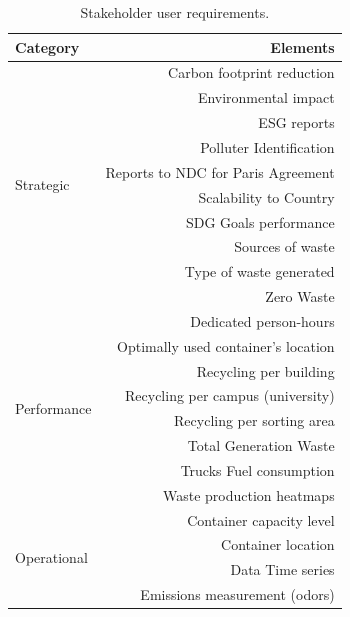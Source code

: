 \documentclass[authoryear,preprint,review,12pt]{elsarticle}
\begin{document}
    \begin{table}
        \centering
        \caption{Stakeholder user requirements.}
        \scriptsize
        \label{tab:initialReq}
        \begin{tabularx}{\columnwidth}{X r}
            \toprule
            Category&Elements\\
            \midrule
            \multirow{10}{*}{Strategic} &Carbon footprint reduction\\
                                    &Environmental impact\\
                                    &ESG reports\\
                                    &Polluter Identification\\
                                    &Reports to NDC for Paris Agreement\\
                                    &Scalability to Country\\
                                    &SDG Goals performance\\
                                    &Sources of waste\\
                                    &Type of waste generated\\
                                    &Zero Waste\\
        \midrule
        \multirow{8}{*}{Performance}&Dedicated person-hours\\
                                    &Optimally used container's location\\
                                    &Recycling per building\\
                                    &Recycling per campus (university)\\
                                    &Recycling per sorting area\\
                                    &Total Generation Waste\\
                                    &Trucks Fuel consumption\\
                                    &Waste production heatmaps\\
        \midrule
        \multirow{14}{*}{Operational}&Container capacity level\\
                                    &Container location\\
                                    &Data Time series\\
                                    &Emissions measurement (odors)\\

\end{tabularx}
\end{table}
\end{document}
